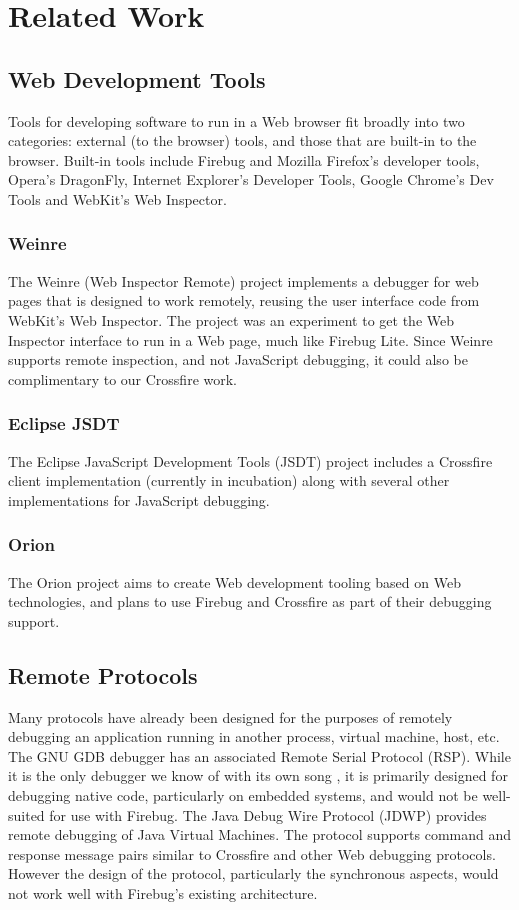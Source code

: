 
\section{Related Work}
\subsection{Web Development Tools}
Tools for developing software to run in a Web browser fit broadly into two
categories: external (to the
browser) tools, and those that are built-in to the browser.
Built-in tools include Firebug and Mozilla Firefox's developer tools,
Opera's DragonFly, Internet Explorer's Developer Tools, Google Chrome's Dev
Tools and WebKit's Web Inspector.

\subsubsection{Weinre}
The Weinre (Web Inspector Remote)\cite{weinre} project implements a debugger for
web pages that is designed to work remotely, reusing the user interface code
from WebKit's Web Inspector. The project was an experiment to get the Web
Inspector interface to run in a Web page, much like Firebug Lite. Since Weinre
supports remote inspection, and not JavaScript debugging, it could also be complimentary
to our Crossfire work.

\subsubsection{Eclipse JSDT}
The Eclipse JavaScript Development Tools (JSDT) project\cite{EclipseJSDT}
includes a Crossfire client implementation (currently in incubation) along with
several other implementations for JavaScript debugging.

\subsubsection{Orion}
The Orion project\cite{orion} aims to create Web development tooling based on
Web technologies, and plans to use Firebug and Crossfire as part of their
debugging support.

\subsection{Remote Protocols}
Many protocols have already been designed for the purposes of remotely debugging
an application running in another process, virtual machine, host, etc. The GNU
GDB debugger has an associated Remote Serial Protocol (RSP)\cite{gdb-rsp}. While
it is the only debugger we know of with its own song \cite{gdb-song}, it is
primarily designed for debugging native code, particularly on embedded
systems, and would not be well-suited for use with Firebug. The Java Debug Wire Protocol (JDWP)
\cite{jdwp} provides remote debugging of Java Virtual Machines. The protocol
supports command and response message pairs similar to Crossfire and other Web
debugging protocols. However the design of the protocol, particularly the
synchronous aspects, would not work well with Firebug's existing architecture.
